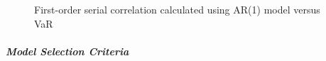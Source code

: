 \documentclass[11pt]{article}
\begin{document}
\begin{figure}[H]
\begin{minipage}[b]{0.48\textwidth}
    \caption{First-order serial correlation calculated using AR(1) model versus VaR}
    \label{fig:SerCol-VaR5yrAR1}
  \end{minipage}
\end{figure}


\subparagraph{Model Selection Criteria}


\newpage

\clearpage
\end{document}

